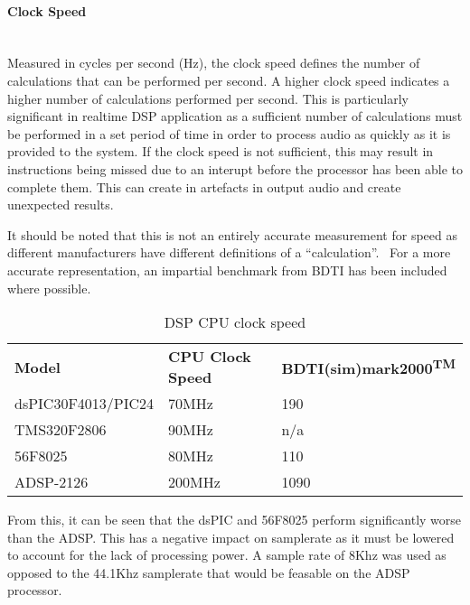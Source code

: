 \documentclass[titlepage]{scrartcl}
\begin{document}
    \paragraph{Clock Speed}~\\
    Measured in cycles per second (Hz), the clock speed defines the number of
    calculations that can be performed per second. A higher clock speed
    indicates a higher number of calculations performed per second. This is
    particularly significant in realtime DSP application as a sufficient number
    of calculations must be performed in a set period of time in order to
    process audio as quickly as it is provided to the system.  If the clock
    speed is not sufficient, this may result in instructions being missed due
    to an interupt before the processor has been able to complete them. This
    can create in artefacts in output audio and create unexpected
    results.~\parencite[p.34]{sd2006mfes}

    It should be noted that this is not an entirely accurate measurement for
    speed as different manufacturers have different definitions of a
    ``calculation''.~\parencite[p.3-4]{bdti2000cdp} For a more accurate
    representation, an impartial benchmark from BDTI has been included where
    possible.~\parencite[p.1]{bdti2013pg}
    \begin{table}[H]
    \centering
    \caption{DSP CPU clock speed}
    \label{my-label}
    \begin{tabular}{lll}
        \textbf{Model}              & \textbf{CPU Clock Speed}
                                    &\textbf{BDTI(sim)mark2000\textsuperscript{TM}}\\
        dsPIC30F4013/PIC24 & 70MHz              & 190\\
        TMS320F2806        & 90MHz              & n/a\\
        56F8025            & 80MHz              & 110\\
        ADSP-2126          & 200MHz             & 1090\\
    \end{tabular}
    \end{table}
    From this, it can be seen that the dsPIC and 56F8025 perform significantly
    worse than the ADSP. This has a negative impact on samplerate as it must be
    lowered to account for the lack of processing power. A sample rate of 8Khz
    was used as opposed to the 44.1Khz samplerate that would be feasable on the
    ADSP processor.
\end{document}
